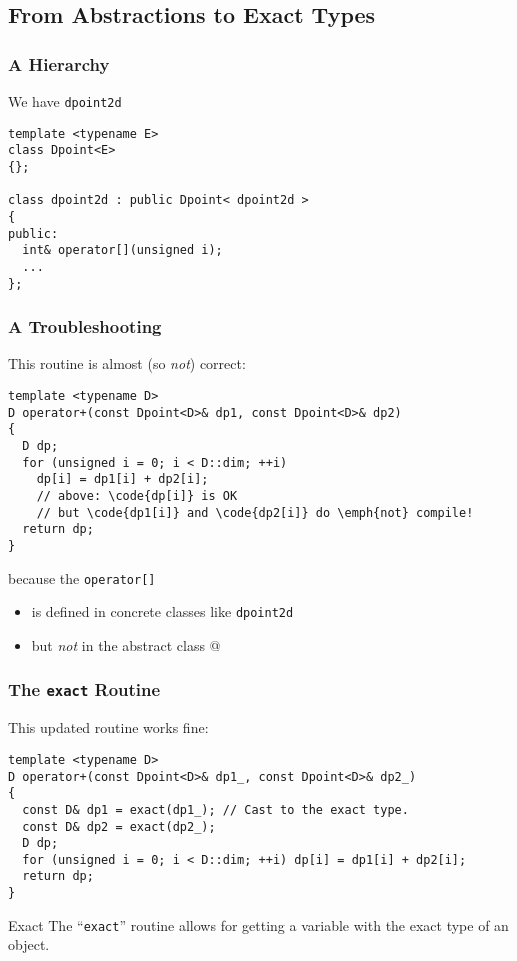 \documentclass{beamer}
\newcommand{\code}[1]{{\scriptsize{\texttt{#1}}}\xspace}
\begin{document}
\subsection{From Abstractions to Exact Types}


\begin{frame}[fragile]
  \frametitle{A Hierarchy}

We have \code{dpoint2d}

\begin{lstlisting}
template <typename E>
class Dpoint<E>
{};

class dpoint2d : public Dpoint< dpoint2d >
{
public:
  int& operator[](unsigned i);
  ...
};
\end{lstlisting}

\end{frame}



\begin{frame}[fragile]
  \frametitle{A Troubleshooting}

This routine is almost (so \emph{not}) correct:
\begin{lstlisting}
template <typename D>
D operator+(const Dpoint<D>& dp1, const Dpoint<D>& dp2)
{
  D dp;
  for (unsigned i = 0; i < D::dim; ++i)
    dp[i] = dp1[i] + dp2[i];
    // above: \code{dp[i]} is OK
    // but \code{dp1[i]} and \code{dp2[i]} do \emph{not} compile!
  return dp;
}
\end{lstlisting}

because the \code{operator[]}
\begin{itemize}
\item is defined in concrete classes like \code{dpoint2d}
\item but \emph{not} in the abstract class
  @
\end{itemize}

\end{frame}


\begin{frame}[fragile]
  \frametitle{The \code{exact} Routine}

This updated routine works fine:

\begin{lstlisting}
template <typename D>
D operator+(const Dpoint<D>& dp1_, const Dpoint<D>& dp2_)
{
  const D& dp1 = exact(dp1_); // Cast to the exact type.
  const D& dp2 = exact(dp2_);
  D dp;
  for (unsigned i = 0; i < D::dim; ++i) dp[i] = dp1[i] + dp2[i];
  return dp;
}
\end{lstlisting}

\begin{block}{Exact}
  The ``\code{exact}'' routine allows for getting a variable with the exact type of an object.
\end{block}

\end{frame}
\end{document}
